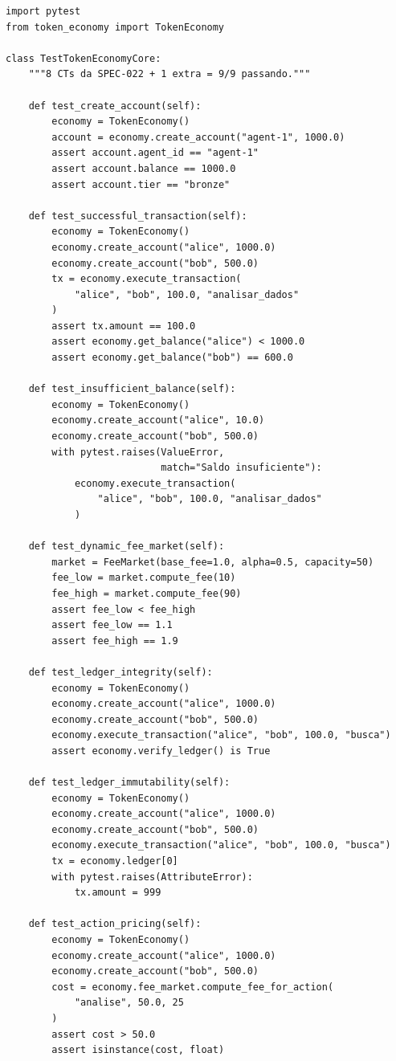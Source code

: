 \begin{lstlisting}[caption={Testes TDD da SPEC-022},label={lst:spec022-tests}]
import pytest
from token_economy import TokenEconomy

class TestTokenEconomyCore:
    """8 CTs da SPEC-022 + 1 extra = 9/9 passando."""

    def test_create_account(self):
        economy = TokenEconomy()
        account = economy.create_account("agent-1", 1000.0)
        assert account.agent_id == "agent-1"
        assert account.balance == 1000.0
        assert account.tier == "bronze"

    def test_successful_transaction(self):
        economy = TokenEconomy()
        economy.create_account("alice", 1000.0)
        economy.create_account("bob", 500.0)
        tx = economy.execute_transaction(
            "alice", "bob", 100.0, "analisar_dados"
        )
        assert tx.amount == 100.0
        assert economy.get_balance("alice") < 1000.0
        assert economy.get_balance("bob") == 600.0

    def test_insufficient_balance(self):
        economy = TokenEconomy()
        economy.create_account("alice", 10.0)
        economy.create_account("bob", 500.0)
        with pytest.raises(ValueError,
                           match="Saldo insuficiente"):
            economy.execute_transaction(
                "alice", "bob", 100.0, "analisar_dados"
            )

    def test_dynamic_fee_market(self):
        market = FeeMarket(base_fee=1.0, alpha=0.5, capacity=50)
        fee_low = market.compute_fee(10)
        fee_high = market.compute_fee(90)
        assert fee_low < fee_high
        assert fee_low == 1.1
        assert fee_high == 1.9

    def test_ledger_integrity(self):
        economy = TokenEconomy()
        economy.create_account("alice", 1000.0)
        economy.create_account("bob", 500.0)
        economy.execute_transaction("alice", "bob", 100.0, "busca")
        assert economy.verify_ledger() is True

    def test_ledger_immutability(self):
        economy = TokenEconomy()
        economy.create_account("alice", 1000.0)
        economy.create_account("bob", 500.0)
        economy.execute_transaction("alice", "bob", 100.0, "busca")
        tx = economy.ledger[0]
        with pytest.raises(AttributeError):
            tx.amount = 999

    def test_action_pricing(self):
        economy = TokenEconomy()
        economy.create_account("alice", 1000.0)
        economy.create_account("bob", 500.0)
        cost = economy.fee_market.compute_fee_for_action(
            "analise", 50.0, 25
        )
        assert cost > 50.0
        assert isinstance(cost, float)


\end{lstlisting}
